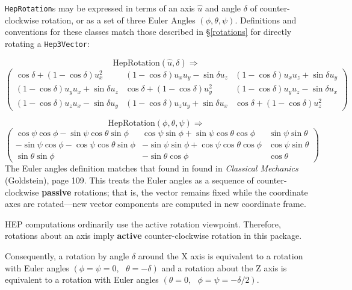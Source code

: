 \documentclass[twoside,12pt]{article}
\def \SV {{\tt Hep3Vector}}
\def \Ro {{\tt HepRotation}}
\begin{document}
\Ro s may be expressed in terms of an axis $\hat{u}$
and angle $\delta$ of counter-clockwise
rotation, or as a set of three Euler Angles $(\phi, \theta, \psi)$.
Definitions and conventions for these classes
match those described in \S \ref{rotations}
for directly rotating a \SV:

\[  \mbox{HepRotation}(\hat{u},\delta) \Longrightarrow \]
\begin{equation}
\label{eq:axisrotR}
\left(
\begin{array}{ccc}
\cos \delta + (1 - \cos \delta ) u_x^2 &
(1 - \cos \delta ) u_x u_y - \sin \delta u_z &
(1 - \cos \delta ) u_x u_z + \sin \delta u_y \\
(1 - \cos \delta ) u_y u_x + \sin \delta u_z &
\cos \delta + (1 - \cos \delta ) u_y^2 &
(1 - \cos \delta ) u_y u_z - \sin \delta u_x \\
(1 - \cos \delta ) u_z u_x - \sin \delta u_y &
(1 - \cos \delta ) u_z u_y + \sin \delta u_x &
\cos \delta + (1 - \cos \delta ) u_z^2
\end{array}
\right)
\end{equation}

\[  \mbox{HepRotation}(\phi, \theta, \psi) \Longrightarrow  \]
\begin{equation}
\label{eq:eulerrotR}
\left(
\begin{array}{ccc}
\cos \psi \cos \phi - \sin \psi \cos \theta \sin \phi &
\cos \psi \sin \phi + \sin \psi \cos \theta \cos \phi &
\sin \psi \sin \theta \\
- \sin \psi \cos \phi - \cos \psi \cos \theta \sin \phi &
- \sin \psi \sin \phi + \cos \psi \cos \theta \cos \phi &
\cos \psi \sin \theta \\
\sin \theta \sin \phi &
- \sin \theta \cos \phi &
\cos \theta
\end{array}
\right)
\end{equation}
\noindent
The Euler angles definition matches that found in found in
{\em Classical Mechanics} (Goldstein), page 109.
This treats the Euler angles as a sequence of counter-clockwise {\bf passive}
rotations;
that is, the vector remains fixed while the coordinate axes are rotated---new
vector components are computed in new coordinate frame.

HEP computations ordinarily use the active rotation viewpoint.
Therefore, rotations about an axis imply {\bf active} counter-clockwise
rotation in this package. 

Consequently, a rotation by angle $\delta$ around the X axis is
equivalent to a rotation with Euler angles
$(\phi=\psi=0, \mbox{ } \theta = - \delta)$
and a rotation about the Z axis is
equivalent to a rotation with Euler angles
$(\theta = 0, \mbox{ } \phi=\psi= - \delta/2)$.
\end{document}

